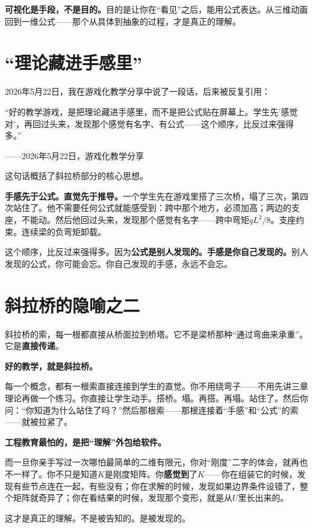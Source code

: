 \textbf{可视化是手段，不是目的。}目的是让你在``看见''之后，能用公式表达。从三维动画回到一维公式——那个从具体到抽象的过程，才是真正的理解。

\section{``理论藏进手感里''}

2026年5月22日，我在游戏化教学分享中说了一段话，后来被反复引用：

\begin{shiyu-inline}
``好的教学游戏，是把理论藏进手感里，而不是把公式贴在屏幕上。学生先'感觉对'，再回过头来，发现那个感觉有名字、有公式——这个顺序，比反过来强得多。''

\hfill ——2026年5月22日，游戏化教学分享
\end{shiyu-inline}

这句话概括了斜拉桥部分的核心思想。

\textbf{手感先于公式。直觉先于推导。}一个学生先在游戏里搭了三次桥，塌了三次，第四次站住了。他不需要任何公式就能感受到：跨中那个地方，必须加高；两边的支座，不能动。然后他回过头来，发现那个感觉有名字——跨中弯矩$qL^2/8$。支座约束。连续梁的负弯矩卸载。

这个顺序，比反过来强得多。因为\textbf{公式是别人发现的。手感是你自己发现的。}别人发现的公式，你可能会忘。你自己发现的手感，永远不会忘。

\section{斜拉桥的隐喻之二}

斜拉桥的索，每一根都直接从桥面拉到桥塔。它不是梁桥那种``通过弯曲来承重''。它是\textbf{直接传递}。

\textbf{好的教学，就是斜拉桥。}

每一个概念，都有一根索直接连接到学生的直觉。你不用绕弯子——不用先讲三章理论再做一个练习。你直接让学生动手。搭桥。塌。再搭。再塌。站住了。然后你问：``你知道为什么站住了吗？''然后那根索——那根连接着``手感''和``公式''的索——就被拉紧了。

\begin{shiyu-note}
\label{note:chap8}

\textbf{工程教育最怕的，是把``理解''外包给软件。}

而一旦你亲手写过一次哪怕最简单的二维有限元，你对``刚度''二字的体会，就再也不一样了。你不只是知道$K$是刚度矩阵。你\textbf{感觉到}了$K$——你在组装它的时候，发现有些节点连在一起，有些没有；你在求解的时候，发现如果边界条件设错了，整个矩阵就奇异了；你在看结果的时候，发现那个变形，就是从$U$里长出来的。

这才是真正的理解。不是被告知的。是被发现的。
\end{shiyu-note}

